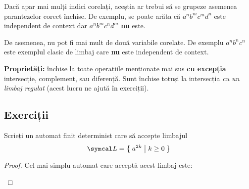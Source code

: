 Dacă apar mai mulți indici corelați, aceștia ar trebui să se grupeze asemenea parantezelor corect închise. De exemplu, se poate arăta că \(a^n b^m c^m d^n\) este independent de context dar \(a^n b^m c^n d^m\) \textbf{nu} este.

De asemenea, nu pot fi mai mult de două variabile corelate. De exemplu \(a^n b^n c^n\) este exemplul clasic de limbaj care \textbf{nu} este independent de context.

\textbf{Proprietăți:} închise la toate operațiile menționate mai sus \textbf{cu excepția} intersecție, complement, sau diferență. Sunt închise totuși la intersecția \emph{cu un limbaj regulat} (acest lucru ne ajută în exerciții).

\subsection*{Exerciții}

\begin{exercise}
    Scrieți un automat finit determinist care să accepte limbajul
    \[\limbaj = \Set{ a^{2k} | k \geq 0 }\]
\end{exercise}
\begin{proof}
    Cel mai simplu automat care acceptă acest limbaj este:
    \begin{figure}[H]
        \centering
    \end{figure}
\end{proof}

